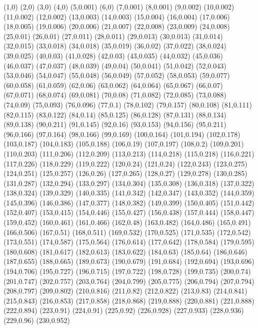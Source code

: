(1,0)
(2,0)
(3,0)
(4,0)
(5,0.001)
(6,0)
(7,0.001)
(8,0.001)
(9,0.002)
(10,0.002)
(11,0.002)
(12,0.002)
(13,0.003)
(14,0.003)
(15,0.004)
(16,0.004)
(17,0.006)
(18,0.005)
(19,0.006)
(20,0.006)
(21,0.007)
(22,0.008)
(23,0.009)
(24,0.008)
(25,0.01)
(26,0.01)
(27,0.011)
(28,0.011)
(29,0.013)
(30,0.013)
(31,0.014)
(32,0.015)
(33,0.018)
(34,0.018)
(35,0.019)
(36,0.02)
(37,0.022)
(38,0.024)
(39,0.025)
(40,0.03)
(41,0.028)
(42,0.03)
(43,0.035)
(44,0.032)
(45,0.036)
(46,0.037)
(47,0.037)
(48,0.039)
(49,0.04)
(50,0.041)
(51,0.042)
(52,0.043)
(53,0.046)
(54,0.047)
(55,0.048)
(56,0.049)
(57,0.052)
(58,0.053)
(59,0.077)
(60,0.058)
(61,0.059)
(62,0.06)
(63,0.062)
(64,0.064)
(65,0.067)
(66,0.07)
(67,0.071)
(68,0.074)
(69,0.081)
(70,0.08)
(71,0.082)
(72,0.085)
(73,0.088)
(74,0.09)
(75,0.093)
(76,0.096)
(77,0.1)
(78,0.102)
(79,0.157)
(80,0.108)
(81,0.111)
(82,0.115)
(83,0.122)
(84,0.14)
(85,0.125)
(86,0.128)
(87,0.131)
(88,0.134)
(89,0.138)
(90,0.211)
(91,0.145)
(92,0.16)
(93,0.153)
(94,0.156)
(95,0.211)
(96,0.166)
(97,0.164)
(98,0.166)
(99,0.169)
(100,0.164)
(101,0.194)
(102,0.178)
(103,0.187)
(104,0.183)
(105,0.188)
(106,0.19)
(107,0.197)
(108,0.2)
(109,0.201)
(110,0.203)
(111,0.206)
(112,0.209)
(113,0.213)
(114,0.218)
(115,0.218)
(116,0.221)
(117,0.226)
(118,0.229)
(119,0.222)
(120,0.24)
(121,0.24)
(122,0.243)
(123,0.275)
(124,0.251)
(125,0.257)
(126,0.26)
(127,0.265)
(128,0.27)
(129,0.278)
(130,0.285)
(131,0.287)
(132,0.294)
(133,0.297)
(134,0.304)
(135,0.308)
(136,0.318)
(137,0.322)
(138,0.324)
(139,0.329)
(140,0.335)
(141,0.342)
(142,0.347)
(143,0.352)
(144,0.359)
(145,0.396)
(146,0.386)
(147,0.377)
(148,0.382)
(149,0.399)
(150,0.405)
(151,0.442)
(152,0.407)
(153,0.415)
(154,0.446)
(155,0.427)
(156,0.438)
(157,0.444)
(158,0.447)
(159,0.452)
(160,0.461)
(161,0.466)
(162,0.48)
(163,0.482)
(164,0.486)
(165,0.491)
(166,0.506)
(167,0.51)
(168,0.511)
(169,0.532)
(170,0.525)
(171,0.535)
(172,0.542)
(173,0.551)
(174,0.587)
(175,0.564)
(176,0.614)
(177,0.642)
(178,0.584)
(179,0.595)
(180,0.608)
(181,0.617)
(182,0.613)
(183,0.622)
(184,0.63)
(185,0.64)
(186,0.646)
(187,0.655)
(188,0.665)
(189,0.673)
(190,0.679)
(191,0.684)
(192,0.694)
(193,0.696)
(194,0.706)
(195,0.727)
(196,0.715)
(197,0.722)
(198,0.728)
(199,0.735)
(200,0.74)
(201,0.747)
(202,0.757)
(203,0.764)
(204,0.799)
(205,0.775)
(206,0.794)
(207,0.794)
(208,0.797)
(209,0.802)
(210,0.816)
(211,0.82)
(212,0.822)
(213,0.83)
(214,0.841)
(215,0.843)
(216,0.853)
(217,0.858)
(218,0.868)
(219,0.888)
(220,0.881)
(221,0.888)
(222,0.894)
(223,0.91)
(224,0.91)
(225,0.92)
(226,0.928)
(227,0.933)
(228,0.936)
(229,0.96)
(230,0.952)
